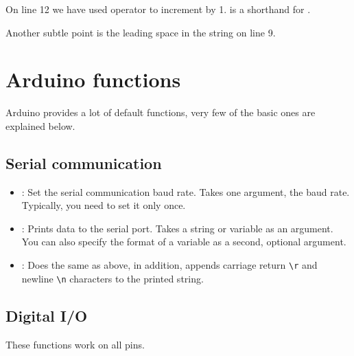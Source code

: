 \documentclass{article}
\begin{document}
			On line 12 we have used \inlncd{+=} operator to increment  by 1.  is a shorthand for .

			Another subtle point is the leading space in the string on line 9.

\section{Arduino functions}

	Arduino provides a lot of default functions, very few of the basic ones are explained below.

	\subsection{Serial communication}

		\begin{itemize}

			\item {}: Set the serial communication baud rate. Takes one argument, the baud rate. Typically, you need to set it only once.

			\item {}: Prints data to the serial port. Takes a string or variable as an argument. You can also specify the format of a variable as a second, optional argument.

			\item {}: Does the same as above, in addition, appends carriage return \texttt{\textbackslash{}r} and newline \texttt{\textbackslash{}n} characters to the printed string.

		\end{itemize}

	\subsection{Digital I/O}

		These functions work on all pins.
\end{document}
